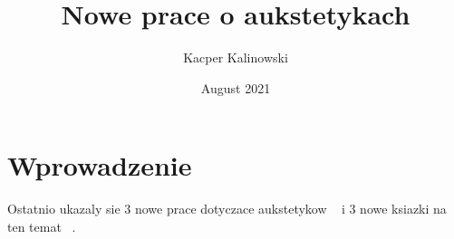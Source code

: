 \documentclass{article}
\title{Nowe prace o aukstetykach}
\author{Kacper Kalinowski }
\date{August 2021}
\begin{document}
\maketitle

\section{Wprowadzenie}

Ostatnio ukazaly sie 3 nowe prace dotyczace aukstetykow ~\cite{JiLuoYe2021MSaSP107945 , WanYaoPenETAL2021Nano415705 , SheXia2021CoSt114066 } i 3 nowe ksiazki na ten temat ~\cite{Lim2015BookAMaS, HuZhaLiu2019BookAT, Lim2020BookMoMwNP}.






\end{document}

